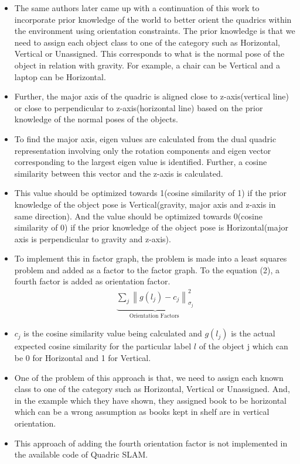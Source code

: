 \documentclass[report.tex]{subfiles}
\begin{document}
\begin{itemize}
\item The same authors later came up with a continuation of this work to incorporate prior knowledge of the world to better orient the quadrics within the environment using orientation constraints\cite{orientation_factor}. The prior knowledge is that we need to assign each object class to one of the category such as Horizontal, Vertical or Unassigned. This corresponds to what is the normal pose of the object in relation with gravity. For example, a chair can be Vertical and a laptop can be Horizontal.
\item Further, the major axis of the quadric is aligned close to z-axis(vertical line) or close to perpendicular to z-axis(horizontal line) based on the prior knowledge of the normal poses of the objects. 
\item To find the major axis, eigen values are calculated from the dual quadric representation involving only the rotation components and eigen vector corresponding to the largest eigen value is identified. Further, a cosine similarity between this vector and the z-axis is calculated.
\item This value should be optimized towards 1(cosine similarity of 1) if the prior knowledge of the object pose is Vertical(gravity, major axis and z-axis in same direction). And the value should be optimized towards 0(cosine similarity of 0) if the prior knowledge of the object pose is Horizontal(major axis is perpendicular to gravity and z-axis).
\item To implement this in factor graph, the problem is made into a least squares problem and added as a factor to the factor graph. To the equation (2), a fourth factor is added as orientation factor.
\begin{equation}
{
\begin{aligned}
\underbrace{\sum_{j}\left\|g\left(l_{j}\right)-c_{j}\right\|_{\sigma_{j}}^{2}}_{\text {Orientation Factors }}
\end{aligned}
}
\end{equation}

\item $c_j$ is the cosine similarity value being calculated and $g(l_j)$ is the actual expected cosine similarity for the particular label $l$ of the object j which can be 0 for Horizontal and 1 for Vertical.

\item One of the problem of this approach is that, we need to assign each known class to one of the category such as Horizontal, Vertical or Unassigned. And, in the example which they have shown, they assigned book to be horizontal which can be a wrong assumption as books kept in shelf are in vertical orientation.
\item This approach of adding the fourth orientation factor is not implemented in the available code of Quadric SLAM.



\end{itemize}
\end{document}
